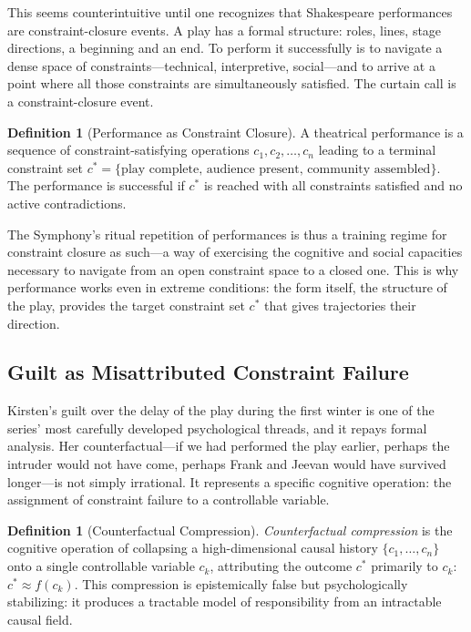 \documentclass[12pt, oneside]{article}
\theoremstyle{plain}
\theoremstyle{definition}
\newtheorem{definition}[theorem]{Definition}
\theoremstyle{remark}
\begin{document}
This seems counterintuitive until one recognizes that Shakespeare
performances are constraint-closure events. A play has a formal
structure: roles, lines, stage directions, a beginning and an end.
To perform it successfully is to navigate a dense space of
constraints---technical, interpretive, social---and to arrive at a
point where all those constraints are simultaneously satisfied. The
curtain call is a constraint-closure event.

\begin{definition}[Performance as Constraint Closure]
A theatrical performance is a sequence of constraint-satisfying
operations $c_1, c_2, \ldots, c_n$ leading to a terminal constraint
set $c^* = \{\text{play complete, audience present, community
assembled}\}$. The performance is successful if $c^*$ is reached
with all constraints satisfied and no active contradictions.
\end{definition}

The Symphony's ritual repetition of performances is thus a training
regime for constraint closure as such---a way of exercising the
cognitive and social capacities necessary to navigate from an open
constraint space to a closed one. This is why performance works
even in extreme conditions: the form itself, the structure of
the play, provides the target constraint set $c^*$ that gives
trajectories their direction.

\subsection{Guilt as Misattributed Constraint Failure}

Kirsten's guilt over the delay of the play during the first winter
is one of the series' most carefully developed psychological
threads, and it repays formal analysis. Her counterfactual---if we
had performed the play earlier, perhaps the intruder would not have
come, perhaps Frank and Jeevan would have survived longer---is not
simply irrational. It represents a specific cognitive operation:
the assignment of constraint failure to a controllable variable.

\begin{definition}[Counterfactual Compression]
\emph{Counterfactual compression} is the cognitive operation of
collapsing a high-dimensional causal history $\{c_1, \ldots, c_n\}$
onto a single controllable variable $c_k$, attributing the outcome
$c^*$ primarily to $c_k$: $c^* \approx f(c_k)$. This compression
is epistemically false but psychologically stabilizing: it produces
a tractable model of responsibility from an intractable causal field.
\end{definition}
\end{document}
